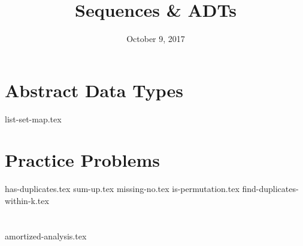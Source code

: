\documentclass[11pt]{exam}
\title{Sequences \& ADTs}
\date{October 9, 2017}
\begin{document}
\maketitle

\section{Abstract Data Types}
{list-set-map.tex}

\clearpage

\section{Practice Problems}
\begin{questions}
{has-duplicates.tex}
{sum-up.tex}
\clearpage
{missing-no.tex}
{is-permutation.tex}
\clearpage
{find-duplicates-within-k.tex}
\end{questions}

\clearpage

\section{}
\begin{questions}
{amortized-analysis.tex}
\end{questions}
\end{document}
